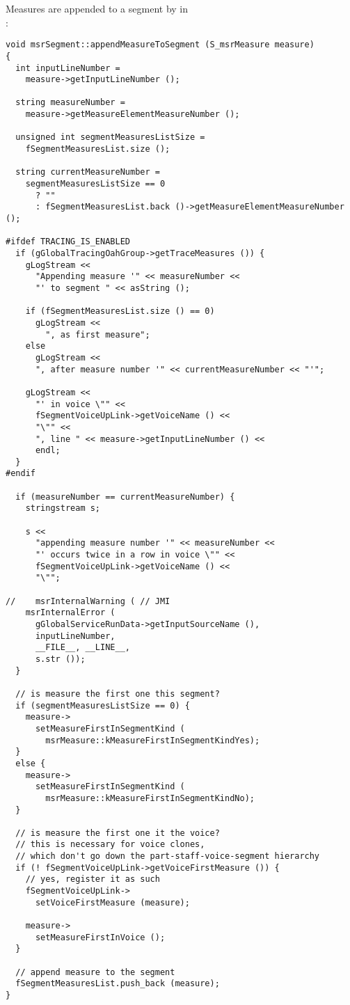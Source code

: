 Measures are appended to a segment by  in \\:
\begin{lstlisting}[language=CPlusPlus]
void msrSegment::appendMeasureToSegment (S_msrMeasure measure)
{
  int inputLineNumber =
    measure->getInputLineNumber ();

  string measureNumber =
    measure->getMeasureElementMeasureNumber ();

  unsigned int segmentMeasuresListSize =
    fSegmentMeasuresList.size ();

  string currentMeasureNumber =
    segmentMeasuresListSize == 0
      ? ""
      : fSegmentMeasuresList.back ()->getMeasureElementMeasureNumber ();

#ifdef TRACING_IS_ENABLED
  if (gGlobalTracingOahGroup->getTraceMeasures ()) {
    gLogStream <<
      "Appending measure '" << measureNumber <<
      "' to segment " << asString ();

    if (fSegmentMeasuresList.size () == 0)
      gLogStream <<
        ", as first measure";
    else
      gLogStream <<
      ", after measure number '" << currentMeasureNumber << "'";

    gLogStream <<
      "' in voice \"" <<
      fSegmentVoiceUpLink->getVoiceName () <<
      "\"" <<
      ", line " << measure->getInputLineNumber () <<
      endl;
  }
#endif

  if (measureNumber == currentMeasureNumber) {
    stringstream s;

    s <<
      "appending measure number '" << measureNumber <<
      "' occurs twice in a row in voice \"" <<
      fSegmentVoiceUpLink->getVoiceName () <<
      "\"";

//    msrInternalWarning ( // JMI
    msrInternalError (
      gGlobalServiceRunData->getInputSourceName (),
      inputLineNumber,
      __FILE__, __LINE__,
      s.str ());
  }

  // is measure the first one this segment?
  if (segmentMeasuresListSize == 0) {
    measure->
      setMeasureFirstInSegmentKind (
        msrMeasure::kMeasureFirstInSegmentKindYes);
  }
  else {
    measure->
      setMeasureFirstInSegmentKind (
        msrMeasure::kMeasureFirstInSegmentKindNo);
  }

  // is measure the first one it the voice?
  // this is necessary for voice clones,
  // which don't go down the part-staff-voice-segment hierarchy
  if (! fSegmentVoiceUpLink->getVoiceFirstMeasure ()) {
    // yes, register it as such
    fSegmentVoiceUpLink->
      setVoiceFirstMeasure (measure);

    measure->
      setMeasureFirstInVoice ();
  }

  // append measure to the segment
  fSegmentMeasuresList.push_back (measure);
}
\end{lstlisting}


